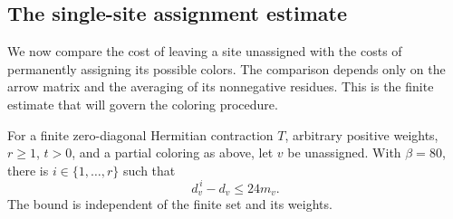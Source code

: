 \subsection{The single-site assignment estimate}

We now compare the cost of leaving a site unassigned with the costs of
permanently assigning its possible colors.  The comparison depends only
on the arrow matrix and the averaging of its nonnegative residues.  This
is the finite estimate that will govern the coloring procedure.

\begin{lemma}\label{lem:assignment}
For a finite zero-diagonal Hermitian contraction \(T\), arbitrary
positive weights, \(r\geq1\), \(t>0\), and a partial coloring as above,
let \(v\) be unassigned.  With \(\beta=80\), there is
\(i\in\{1,\ldots,r\}\) such that
\begin{equation}
                         d_v^{\,i}-d_v\leq24m_v.
 \label{eq:poly-assignment}
\end{equation}
The bound is independent of the finite set and its weights.
\end{lemma}

